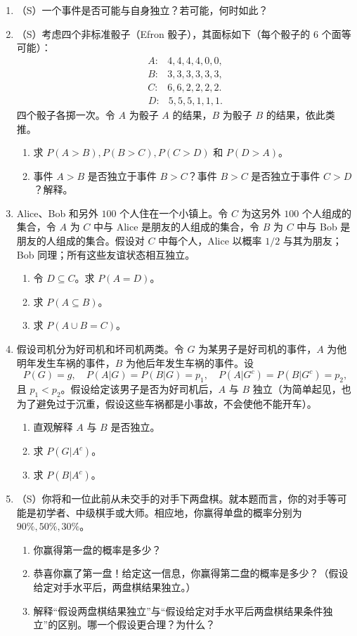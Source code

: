 \documentclass[UTF8,12pt,a4paper,fontset=fandol]{ctexart}
\begin{document}
\begin{enumerate}
  \item （S）一个事件是否可能与自身独立？若可能，何时如此？

  \item （S）考虑四个非标准骰子（Efron 骰子），其面标如下（每个骰子的 $6$ 个面等可能）：
  \[
  \begin{array}{ll}
    A: & 4,4,4,4,0,0,\\
    B: & 3,3,3,3,3,3,\\
    C: & 6,6,2,2,2,2.
  \end{array}
  \]
  \[
  \begin{array}{ll}
    D: & 5,5,5,1,1,1.
  \end{array}
  \]
  四个骰子各掷一次。令 $A$ 为骰子 $A$ 的结果，$B$ 为骰子 $B$ 的结果，依此类推。
  \begin{enumerate}
    \item 求 $P(A>B),P(B>C),P(C>D)$ 和 $P(D>A)$。
    \item 事件 $A>B$ 是否独立于事件 $B>C$？事件 $B>C$ 是否独立于事件 $C>D$？解释。
  \end{enumerate}

  \item Alice、Bob 和另外 $100$ 个人住在一个小镇上。令 $C$ 为这另外 $100$ 个人组成的集合，令 $A$ 为 $C$ 中与 Alice 是朋友的人组成的集合，令 $B$ 为 $C$ 中与 Bob 是朋友的人组成的集合。假设对 $C$ 中每个人，Alice 以概率 $1/2$ 与其为朋友；Bob 同理；所有这些友谊状态相互独立。
  \begin{enumerate}
    \item 令 $D\subseteq C$。求 $P(A=D)$。
    \item 求 $P(A\subseteq B)$。
    \item 求 $P(A\cup B=C)$。
  \end{enumerate}

  \item 假设司机分为好司机和坏司机两类。令 $G$ 为某男子是好司机的事件，$A$ 为他明年发生车祸的事件，$B$ 为他后年发生车祸的事件。设
  \[
    P(G)=g,\quad P(A|G)=P(B|G)=p_1,\quad
    P(A|G^c)=P(B|G^c)=p_2,
  \]
  且 $p_1<p_2$。假设给定该男子是否为好司机后，$A$ 与 $B$ 独立（为简单起见，也为了避免过于沉重，假设这些车祸都是小事故，不会使他不能开车）。
  \begin{enumerate}
    \item 直观解释 $A$ 与 $B$ 是否独立。
    \item 求 $P(G|A^c)$。
    \item 求 $P(B|A^c)$。
  \end{enumerate}

  \item （S）你将和一位此前从未交手的对手下两盘棋。就本题而言，你的对手等可能是初学者、中级棋手或大师。相应地，你赢得单盘的概率分别为 $90\%,50\%,30\%$。
  \begin{enumerate}
    \item 你赢得第一盘的概率是多少？
    \item 恭喜你赢了第一盘！给定这一信息，你赢得第二盘的概率是多少？（假设给定对手水平后，两盘棋结果独立。）
    \item 解释“假设两盘棋结果独立”与“假设给定对手水平后两盘棋结果条件独立”的区别。哪一个假设更合理？为什么？
  \end{enumerate}


\end{enumerate}
\end{document}
